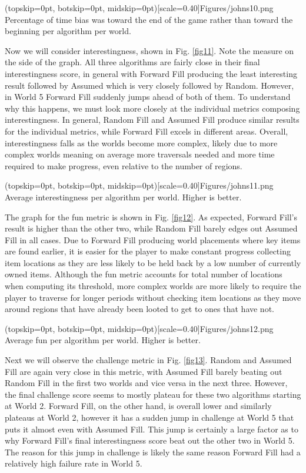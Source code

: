 \documentclass{ieeeaccess}
\begin{document}
\Figure[t!](topskip=0pt, botskip=0pt, midskip=0pt)[scale=0.40]{Figures/johns10.png}
{Percentage of time bias was toward the end of the game rather than toward the beginning per
algorithm per world.\label{fig10}}

Now we will consider interestingness, shown in Fig. \ref{fig11}. Note the measure on the side
of the graph. All three algorithms are fairly close in their final interestingness score, in
general with Forward Fill producing the least interesting result followed by Assumed which is
very closely followed by Random. However, in World 5 Forward Fill suddenly jumps ahead of both
of them. To understand why this happens, we must look more closely at the individual metrics
composing interestingness. In general, Random Fill and Assumed Fill produce similar results for
the individual metrics, while Forward Fill excels in different areas. Overall, interestingness
falls as the worlds become more complex, likely due to more complex worlds meaning on average
more traversals needed and more time required to make progress, even relative to the number of
regions.

\Figure[t!](topskip=0pt, botskip=0pt, midskip=0pt)[scale=0.40]{Figures/johns11.png}
{Average interestingness per algorithm per world. Higher is better.\label{fig11}}

The graph for the fun metric is shown in Fig. \ref{fig12}. As expected, Forward Fill’s result
is higher than the other two, while Random Fill barely edges out Assumed Fill in all cases. Due
to Forward Fill producing world placements where key items are found earlier, it is easier for
the player to make constant progress collecting item locations as they are less likely to be
held back by a low number of currently owned items. Although the fun metric accounts for total
number of locations when computing its threshold, more complex worlds are more likely to
require the player to traverse for longer periods without checking item locations as they move
around regions that have already been looted to get to ones that have not.

\Figure[t!](topskip=0pt, botskip=0pt, midskip=0pt)[scale=0.40]{Figures/johns12.png}
{Average fun per algorithm per world. Higher is better.\label{fig12}}

Next we will observe the challenge metric in Fig. \ref{fig13}. Random and Assumed Fill are
again very close in this metric, with Assumed Fill barely beating out Random Fill in the first
two worlds and vice versa in the next three. However, the final challenge score seems to mostly
plateau for these two algorithms starting at World 2. Forward Fill, on the other hand, is
overall lower and similarly plateaus at World 2, however it has a sudden jump in challenge at
World 5 that puts it almost even with Assumed Fill. This jump is certainly a large factor as to
why Forward Fill’s final interestingness score beat out the other two in World 5. The reason
for this jump in challenge is likely the same reason Forward Fill had a relatively high failure
rate in World 5.
\end{document}
